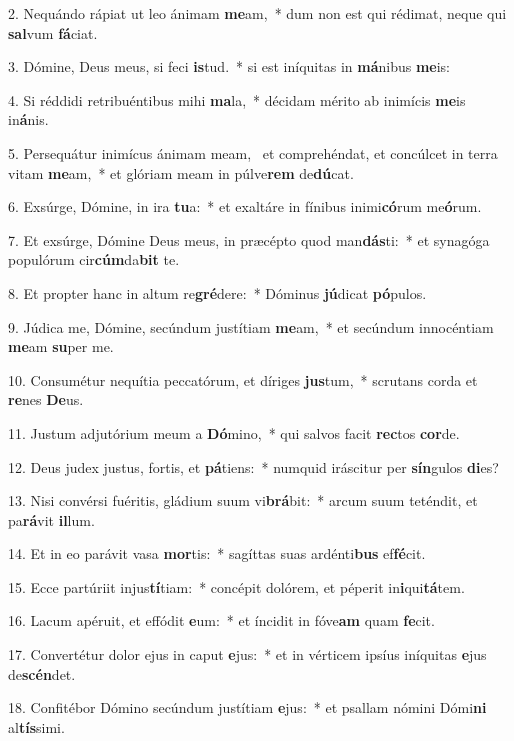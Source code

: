2. Nequándo rápiat ut leo ánimam \textbf{me}am,~*  dum non est qui rédimat, neque qui \textbf{sal}vum \textbf{fá}ciat.\

3. Dómine, Deus meus, si feci \textbf{is}tud.~*  si est iníquitas in \textbf{má}nibus \textbf{me}is:\

4. Si réddidi retribuéntibus mihi \textbf{ma}la,~*  décidam mérito ab inimícis \textbf{me}is in\textbf{á}nis.\

5. Persequátur inimícus ánimam meam, \dag\  et comprehéndat, et concúlcet in terra vitam \textbf{me}am,~*  et glóriam meam in púlve\textbf{rem} de\textbf{dú}cat.\

6. Exsúrge, Dómine, in ira \textbf{tu}a:~*  et exaltáre in fínibus inimi\textbf{có}rum me\textbf{ó}rum.\

7. Et exsúrge, Dómine Deus meus, in præcépto quod man\textbf{dás}ti:~*  et synagóga populórum cir\textbf{cúm}da\textbf{bit} te.\

8. Et propter hanc in altum re\textbf{gré}dere:~*  Dóminus \textbf{jú}dicat \textbf{pó}pulos.\

9. Júdica me, Dómine, secúndum justítiam \textbf{me}am,~*  et secúndum innocéntiam \textbf{me}am \textbf{su}per me.\

10. Consumétur nequítia peccatórum, et díriges \textbf{jus}tum,~*  scrutans corda et \textbf{re}nes \textbf{De}us.\

11. Justum adjutórium meum a \textbf{Dó}mino,~*  qui salvos facit \textbf{rec}tos \textbf{cor}de.\

12. Deus judex justus, fortis, et \textbf{pá}tiens:~*  numquid iráscitur per \textbf{sín}gulos \textbf{di}es?\

13. Nisi convérsi fuéritis, gládium suum vi\textbf{brá}bit:~*  arcum suum teténdit, et pa\textbf{rá}vit \textbf{il}lum.\

14. Et in eo parávit vasa \textbf{mor}tis:~*  sagíttas suas ardénti\textbf{bus} ef\textbf{fé}cit.\

15. Ecce partúriit injus\textbf{tí}tiam:~*  concépit dolórem, et péperit in\textbf{i}qui\textbf{tá}tem.\

16. Lacum apéruit, et effódit \textbf{e}um:~*  et íncidit in fóve\textbf{am} quam \textbf{fe}cit.\

17. Convertétur dolor ejus in caput \textbf{e}jus:~*  et in vérticem ipsíus iníquitas \textbf{e}jus de\textbf{scén}det.\

18. Confitébor Dómino secúndum justítiam \textbf{e}jus:~*  et psallam nómini Dómi\textbf{ni} al\textbf{tís}simi.\

